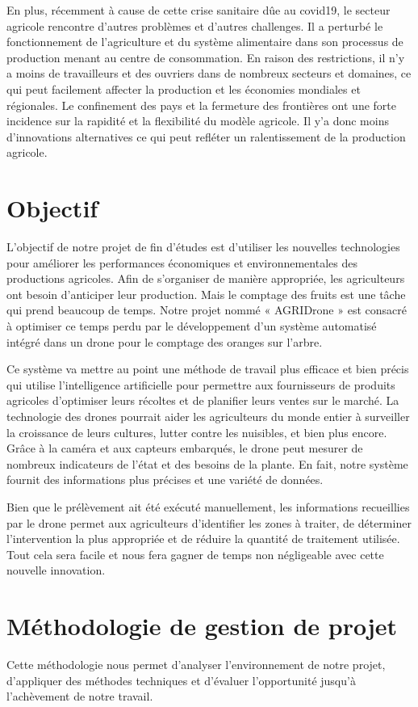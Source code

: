 En plus, récemment à cause de cette crise sanitaire dûe au covid19, le secteur agricole rencontre d'autres problèmes et d'autres challenges. Il a perturbé le fonctionnement de l'agriculture et du système alimentaire dans son processus de production menant au centre de consommation. En raison des restrictions, il n'y a moins de travailleurs et des ouvriers dans de nombreux secteurs et domaines, ce qui peut facilement affecter la production et les économies mondiales et régionales. Le confinement des pays et la fermeture des frontières ont une forte incidence sur la rapidité et la flexibilité du modèle agricole. Il y'a donc moins d'innovations alternatives ce qui peut refléter un ralentissement de la production agricole.
\section{Objectif }
L'objectif de notre projet de fin d'études est d'utiliser les nouvelles technologies pour améliorer les performances économiques et environnementales des productions agricoles. Afin de s'organiser de manière appropriée, les agriculteurs ont besoin d'anticiper leur production. Mais le comptage des fruits est une tâche qui prend beaucoup de temps. Notre projet nommé « AGRIDrone » est consacré à optimiser ce temps perdu par le développement d'un système automatisé intégré dans un drone pour le comptage des oranges sur l'arbre. 


Ce système va mettre au point une méthode de travail plus efficace et bien précis qui utilise l'intelligence artificielle pour permettre aux fournisseurs de produits agricoles d'optimiser leurs récoltes et de planifier leurs ventes sur le marché. La technologie des drones pourrait aider les agriculteurs du monde entier à surveiller la croissance de leurs cultures, lutter contre les nuisibles, et bien plus encore. Grâce à la caméra et aux capteurs embarqués, le drone peut mesurer de nombreux indicateurs de l'état et des besoins de la plante. En fait, notre système fournit des informations plus précises et une variété de données.

Bien que le prélèvement ait été exécuté manuellement, les informations recueillies par le drone permet aux agriculteurs d'identifier les zones à traiter, de déterminer l'intervention la plus appropriée et de réduire la quantité de traitement utilisée. Tout cela sera facile et nous fera gagner de temps non négligeable avec cette nouvelle innovation.



\section[Methodologie]{Méthodologie de gestion de projet }
Cette méthodologie nous permet d'analyser l'environnement de notre projet, d'appliquer des méthodes techniques et d'évaluer l'opportunité jusqu'à l'achèvement de notre travail.
